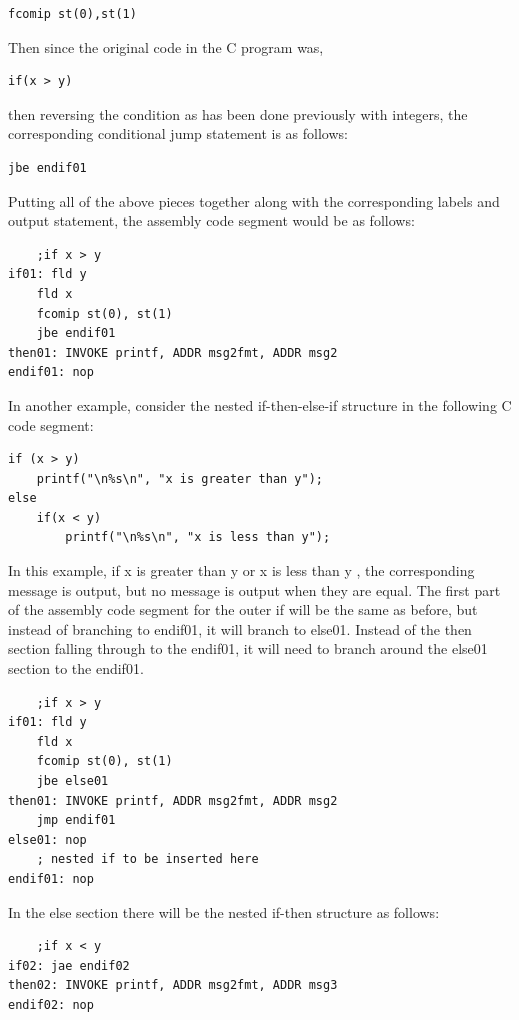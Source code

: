 \documentclass[10pt]{article}
\begin{document}
\begin{verbatim}
fcomip st(0),st(1)
\end{verbatim}

Then since the original code in the C program was,

\begin{verbatim}
if(x > y)
\end{verbatim}

then reversing the condition as has been done previously with integers, the corresponding conditional jump statement is as follows:

\begin{verbatim}
jbe endif01
\end{verbatim}

Putting all of the above pieces together along with the corresponding labels and output statement, the assembly code segment would be as follows:

\begin{verbatim}
    ;if x > y
if01: fld y
    fld x
    fcomip st(0), st(1)
    jbe endif01
then01: INVOKE printf, ADDR msg2fmt, ADDR msg2
endif01: nop
\end{verbatim}

In another example, consider the nested if-then-else-if structure in the following C code segment:

\begin{verbatim}
if (x > y)
    printf("\n%s\n", "x is greater than y");
else
    if(x < y)
        printf("\n%s\n", "x is less than y");
\end{verbatim}

In this example, if x is greater than y or x is less than y , the corresponding message is output, but no message is output when they are equal. The first part of the assembly code segment for the outer if will be the same as before, but instead of branching to endif01, it will branch to else01. Instead of the then section falling through to the endif01, it will need to branch around the else01 section to the endif01.

\begin{verbatim}
    ;if x > y
if01: fld y
    fld x
    fcomip st(0), st(1)
    jbe else01
then01: INVOKE printf, ADDR msg2fmt, ADDR msg2
    jmp endif01
else01: nop
    ; nested if to be inserted here
endif01: nop
\end{verbatim}

In the else section there will be the nested if-then structure as follows:

\begin{verbatim}
    ;if x < y
if02: jae endif02
then02: INVOKE printf, ADDR msg2fmt, ADDR msg3
endif02: nop
\end{verbatim}
\end{document}
